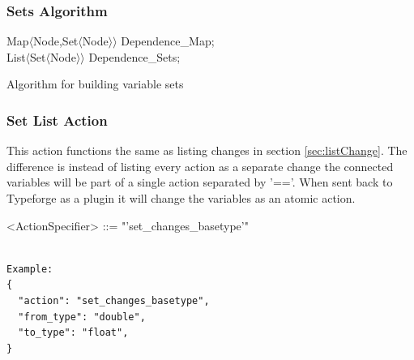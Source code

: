 \documentclass[natbib]{article}
\begin{document}
\subsubsection{Sets Algorithm} \label{sec:setAlg}
\begin{algorithm}[H]
\label{variableSetAlgo}
\SetAlgoLined
{}
Map$\langle$Node,Set$\langle$Node$\rangle\rangle$ Dependence\_Map;\\
List$\langle$Set$\langle$Node$\rangle\rangle$ Dependence\_Sets;\\
 \caption{Algorithm for building variable sets}
\end{algorithm}

\subsubsection{Set List Action}
This action functions the same as listing changes in section \ref{sec:listChange}. The difference is instead 
of listing every action as a separate change the connected variables will be part of a single action 
separated by '=='. When sent back to Typeforge as a plugin it will change the variables as an atomic action.

\begin{grammar}
<ActionSpecifier>  ::= "'set_changes_basetype'"
\end{grammar}
\begin{verbatim}  

Example:
{
  "action": "set_changes_basetype",
  "from_type": "double",
  "to_type": "float",
}
\end{verbatim}
\end{document}
